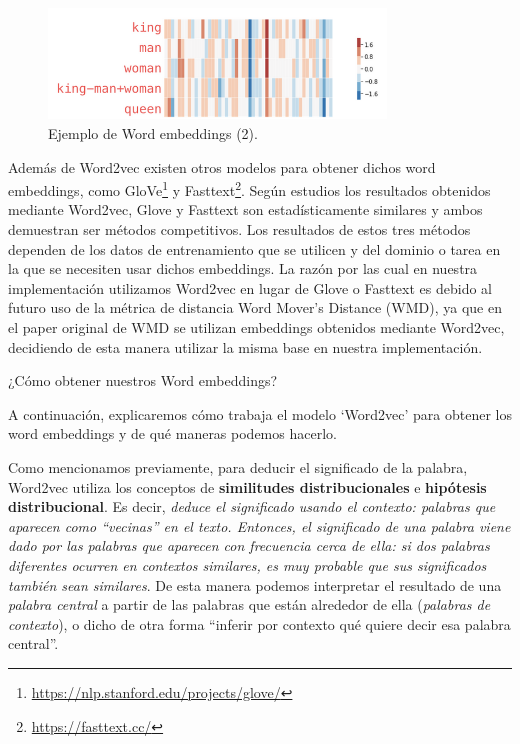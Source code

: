 \documentclass[12pt,a4paper]{article}
\makeatletter
\renewcommand\paragraph{\@startsection{paragraph}{4}{\z@}
            {-2.5ex\@plus -1ex \@minus -.25ex}
            {1.25ex \@plus .25ex}
            {\normalfont\normalsize\bfseries}}
\makeatother
\begin{document}
\begin{sloppypar}
\begin{figure}[H]    
 \centering
 \includegraphics[width=0.8\textwidth]{images/NLP/14.png}
 \caption{Ejemplo de Word embeddings (2)\cite{datitos_nlp}.}
 \label{fig:Imagen_NLP_14}
\end{figure}

Además de Word2vec existen otros modelos para obtener dichos word embeddings, como GloVe\footnote{\url{https://nlp.stanford.edu/projects/glove/}} y Fasttext\footnote{\url{https://fasttext.cc/}}. Según estudios\cite{NLP_12, NLP_13} los resultados obtenidos mediante Word2vec, Glove y Fasttext son estadísticamente similares y ambos demuestran ser métodos competitivos. Los resultados de estos tres métodos dependen de los datos de entrenamiento que se utilicen y del dominio o tarea en la que se necesiten usar dichos embeddings. La razón por las cual en nuestra implementación utilizamos Word2vec en lugar de Glove o Fasttext es debido al futuro uso de la métrica de distancia Word Mover's Distance (WMD), ya que en el paper original de WMD\cite{wmd_paper} se utilizan embeddings obtenidos mediante Word2vec, decidiendo de esta manera utilizar la misma base en nuestra implementación.

\cleardoublepage

\paragraph{¿Cómo obtener nuestros Word embeddings?}\label{obt_word_emb}

A continuación, explicaremos cómo trabaja el modelo ‘Word2vec’ para obtener los word embeddings y de qué maneras podemos hacerlo\cite{NLP_26}.

Como mencionamos previamente, para deducir el significado de la palabra, Word2vec utiliza los conceptos de \textbf{similitudes distribucionales} e \textbf{hipótesis distribucional}. Es decir, \textit{deduce el significado usando el contexto: palabras que aparecen como “vecinas” en el texto. Entonces, el significado de una palabra viene dado por las palabras que aparecen con frecuencia cerca de ella: si dos palabras diferentes ocurren en contextos similares, es muy probable que sus significados también sean similares}. De esta manera podemos interpretar el resultado de una \textit{palabra central} a partir de las palabras que están alrededor de ella (\textit{palabras de contexto}), o dicho de otra forma “inferir por contexto qué quiere decir esa palabra central”. 


\end{sloppypar}
\end{document}
